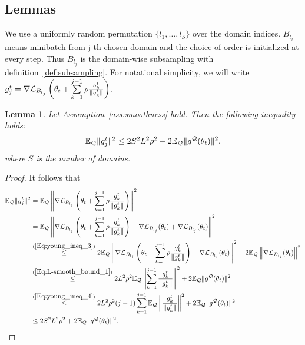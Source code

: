 \documentclass{article}
\theoremstyle{plain}
\newtheorem{proposition}[theorem]{Proposition}
\newtheorem{lemma}[theorem]{Lemma}
\theoremstyle{definition}
\theoremstyle{remark}
\newcommand{\EgQ}{\E_\gQ}
\begin{document}
\subsection{Lemmas}


We use a uniformly random permutation \( \{l_1, \ldots, l_{S}\} \) over the domain indices. \(B_{l_j}\) means minibatch from j-th chosen domain and the choice of order is initialized at every step. Thus \(B_{l_j}\) is the domain-wise subsampling with definition~\ref{def:subsampling}. For notational simplicity, we will write \(g_j^t = \nabla{\mathcal{L}}_{ B_{l_j}}\left(\theta_t+\sum\limits_{k=1}^{j-1}\rho\frac{g_k^t}{\lVert g_k^t \rVert}\right)\). %

\begin{lemma}\label{lem:1}
    Let Assumption~\ref{ass:smoothness} hold. Then the following inequality holds:
    \[
    \EgQ\lV g_j^t\rV^2 \leq 2S^2L^2\rho^2+2\EgQ\lV g^{\gQ}(\theta_t)\rV^2,
    \]
    where \(S\) is the number of domains.
\end{lemma}
\begin{proof}
It follows that 
\begin{align*} 
\EgQ\lV g_j^t\rV^2 &= \EgQ\left\lV \nabla\gL_{B_{l_j}}\left(\theta_t+\sum\limits_{k=1}^{j-1}\rho\frac{g_k^t}{\lVert g_k^t \rVert}\right)\right\rV^2 \\
&= \EgQ\left\lV \nabla\gL_{B_{l_j}}\left(\theta_t+\sum\limits_{k=1}^{j-1}\rho\frac{g_k^t}{\lVert g_k^t \rVert}\right)-\nabla\gL_{B_{l_j}}(\theta_t)+\nabla\gL_{B_{l_j}}(\theta_t)\right\rV^2 \\
&\overset{(\ref{Eq:young_ineq_3})}{\leq} 2\EgQ\left\lV \nabla\gL_{B_{l_j}}\left(\theta_t+\sum\limits_{k=1}^{j-1}\rho\frac{g_k^t}{\lVert g_k^t \rVert}\right)-\nabla\gL_{B_{l_j}}(\theta_t)\right\rV^2 + 2\EgQ\left\lV \nabla\gL_{B_{l_j}}(\theta_t)\right\rV^2\\
&\overset{(\ref{Eq:L-smooth_bound_1})}{\leq} 2L^2\rho^2 \EgQ\left\lV \sum\limits_{k=1}^{j-1}\frac{g_k^t}{\lVert g_k^t \rVert} \right\rV^2 + 2\EgQ\lV g^{\gQ}(\theta_t)\rV^2 \\
&\overset{(\ref{Eq:young_ineq_4})}{\leq} 2L^2\rho^2 (j-1)\sum\limits_{k=1}^{j-1}\EgQ\left\lV \frac{g_k^t}{\lVert g_k^t \rVert} \right\rV^2 + 2\EgQ\lV g^{\gQ}(\theta_t)\rV^2 \\
&\leq 2S^2L^2\rho^2+2\EgQ\lV g^{\gQ}(\theta_t)\rV^2.
\end{align*}
\end{proof}
\end{document}
